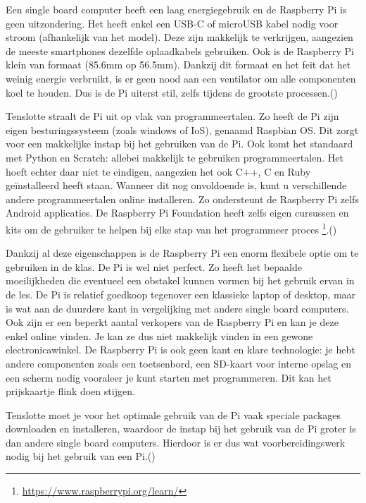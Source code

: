 Een single board computer heeft een laag energiegebruik en de Raspberry Pi is geen uitzondering. Het heeft enkel een USB-C of microUSB kabel nodig voor stroom (afhankelijk van het model). Deze zijn makkelijk te verkrijgen, aangezien de meeste smartphones dezelfde oplaadkabels gebruiken. Ook is de Raspberry Pi klein van formaat (85.6mm op 56.5mm). Dankzij dit formaat en het feit dat het weinig energie verbruikt, is er geen nood aan een ventilator om alle componenten koel te houden. Dus is de Pi uiterst stil, zelfs tijdens de grootste processen.(\cite{Foundationa}) 

Tenslotte straalt de Pi uit op vlak van programmeertalen. Zo heeft de Pi zijn eigen besturingssysteem (zoals windows of IoS), genaamd Raspbian OS. Dit zorgt voor een makkelijke instap bij het gebruiken van de Pi. Ook komt het standaard met Python en Scratch: allebei makkelijk te gebruiken programmeertalen. Het hoeft echter daar niet te eindigen, aangezien het ook C++, C en Ruby geïnstalleerd heeft staan. Wanneer dit nog onvoldoende is, kunt u verschillende andere programmeertalen online installeren. Zo ondersteunt de Raspberry Pi zelfs Android applicaties. De Raspberry Pi Foundation heeft zelfs eigen cursussen en kits om de gebruiker te helpen bij elke stap van het programmeer proces \footnote{\url{https://www.raspberrypi.org/learn/}}.(\cite{Pattichis2017,Teja2021,Koelling2016})

Dankzij al deze eigenschappen is de Raspberry Pi een enorm flexibele optie om te gebruiken in de klas. De Pi is wel niet perfect. Zo heeft het bepaalde moeilijkheden die eventueel een obstakel kunnen vormen bij het gebruik ervan in de les. 
De Pi is relatief goedkoop tegenover een klassieke laptop of desktop, maar is wat aan de duurdere kant in vergelijking met andere single board computers. Ook zijn er een beperkt aantal verkopers van de Raspberry Pi en kan je deze enkel online vinden. Je kan ze dus niet makkelijk vinden in een gewone electronicawinkel. 
De Raspberry Pi is ook geen kant en klare technologie: je hebt andere componenten zoals een toetsenbord, een SD-kaart voor interne opslag en een scherm nodig vooraleer je kunt starten met programmeren. Dit kan het prijskaartje flink doen stijgen.

Tenslotte moet je voor het optimale gebruik van de Pi vaak speciale packages downloaden en installeren, waardoor de instap bij het gebruik van de Pi groter is dan andere single board computers. Hierdoor is er dus wat voorbereidingswerk nodig bij het gebruik van een Pi.(\cite{Teja2021})

